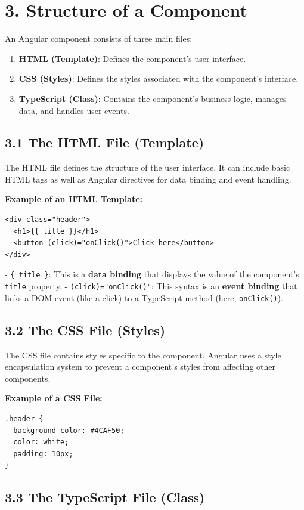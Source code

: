 \documentclass{article}
\begin{document}
\section*{3. Structure of a Component}

An Angular component consists of three main files:
\begin{enumerate}
  \item \textbf{HTML (Template)}: Defines the component's user interface.
  \item \textbf{CSS (Styles)}: Defines the styles associated with the component's interface.
  \item \textbf{TypeScript (Class)}: Contains the component's business logic, manages data, and handles user events.
\end{enumerate}

\subsection*{3.1 The HTML File (Template)}

The HTML file defines the structure of the user interface. It can include basic HTML tags as well as Angular directives for data binding and event handling.

\textbf{Example of an HTML Template:}
\begin{verbatim}
<div class="header">
  <h1>{{ title }}</h1>
  <button (click)="onClick()">Click here</button>
</div>
\end{verbatim}
- \texttt{{\{ title \}}}: This is a \textbf{data binding} that displays the value of the component's \texttt{title} property.
- \texttt{(click)="onClick()"}: This syntax is an \textbf{event binding} that links a DOM event (like a click) to a TypeScript method (here, \texttt{onClick()}).

\subsection*{3.2 The CSS File (Styles)}

The CSS file contains styles specific to the component. Angular uses a style encapsulation system to prevent a component's styles from affecting other components.

\textbf{Example of a CSS File:}
\begin{verbatim}
.header {
  background-color: #4CAF50;
  color: white;
  padding: 10px;
}
\end{verbatim}

\subsection*{3.3 The TypeScript File (Class)}
\end{document}
